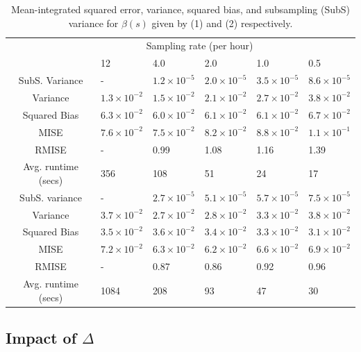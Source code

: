 \documentclass[12pt]{amsart}
\begin{document}

\begin{table}[!th]
\begin{tabular}{c | p{2cm} p{2cm} p{2cm} p{2cm} p{2cm}}
& \multicolumn{4}{c}{Sampling rate (per hour)} \\ \cline{2-6}
 & 12 & 4.0 & 2.0 & 1.0 & 0.5 \\ \hline
SubS. Variance & - & $1.2 \times 10^{-5}$ & $2.0 \times 10^{-5}$ & $3.5 \times 10^{-5}$ & $8.6 \times 10^{-5}$  \\
Variance & $1.3 \times 10^{-2}$ & $1.5 \times 10^{-2}$ & $2.1 \times 10^{-2}$ & $2.7 \times 10^{-2}$ & $3.8 \times 10^{-2}$\\
Squared Bias & $6.3 \times 10^{-2}$ & $6.0 \times 10^{-2}$ & $6.1 \times 10^{-2}$ & $6.1 \times 10^{-2}$ & $6.7 \times 10^{-2}$   \\
MISE & $7.6 \times 10^{-2}$  & $7.5 \times 10^{-2}$  & $8.2 \times 10^{-2}$ & $8.8 \times 10^{-2}$ & $1.1 \times 10^{-1}$ \\
RMISE & -  & 0.99  & 1.08 & 1.16 & 1.39 \\ \hline
Avg. runtime (secs) & 356 & 108 & 51 & 24 & 17 \\ \hline
SubS. variance & - & $2.7 \times 10^{-5}$ & $5.1 \times 10^{-5}$ & $5.7 \times 10^{-5}$ & $7.5 \times 10^{-5}$  \\
Variance & $3.7 \times 10^{-2}$ & $2.7 \times 10^{-2}$ & $2.8 \times 10^{-2}$ & $3.3 \times 10^{-2}$ &  $3.8 \times 10^{-2}$\\
Squared Bias & $3.5 \times 10^{-2}$ & $3.6 \times 10^{-2}$ & $3.4 \times 10^{-2}$ & $3.3 \times 10^{-2}$ & $3.1 \times 10^{-2}$ \\
MISE & $7.2 \times 10^{-2}$ & $6.3 \times 10^{-2}$ & $6.2 \times 10^{-2}$ & $6.6 \times 10^{-2}$ & $6.9 \times 10^{-2}$ \\
RMISE & -  & 0.87  & 0.86 & 0.92 & 0.96 \\ \hline
Avg. runtime (secs) & 1084 & 208 & 93 & 47 & 30 \\ \hline
\end{tabular}
\caption{Mean-integrated squared error, variance, squared bias, and subsampling (SubS) variance for $\beta(s)$ given by (1) and (2) respectively.}
\label{tab:mise}
\end{table}

\subsection{Impact of $\Delta$}
\end{document}
